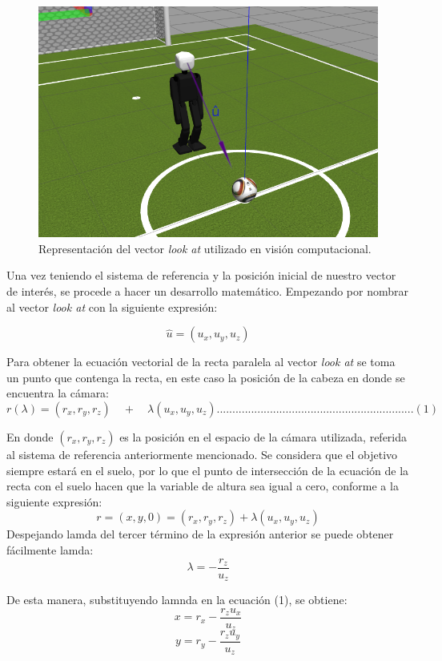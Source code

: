 \documentclass{book}
\begin{document}
\begin{figure}
	\centering		
	\includegraphics[scale=2]{images/robot_lookat.png}
	\caption{Representación del vector \textit{look at} utilizado en visión computacional.}		
\end{figure}


Una vez teniendo el sistema de referencia y la posición inicial de nuestro vector de interés, se procede a hacer un desarrollo matemático. Empezando por nombrar al vector \textit{look at} con la siguiente expresión:

\[\hat{u} = (u_x, u_y, u_z)\]
 
Para obtener la ecuación vectorial de la recta paralela al vector \textit{look at} se toma un punto que contenga la recta, en este caso la posición de la cabeza en donde se encuentra la cámara:
\[r(\lambda) = (r_x, r_y, r_z)\quad +\quad \lambda (u_x, u_y, u_z)...............................................................(1)\]

En donde $(r_x, r_y, r_z)$ es la posición en el espacio de la cámara utilizada, referida al sistema de referencia anteriormente mencionado. Se considera que el objetivo siempre estará en el suelo, por lo que el punto de intersección de la ecuación de la recta con el suelo hacen que la variable de altura sea igual a cero, conforme a la siguiente expresión:
\[r = (x, y, 0) = (r_x, r_y, r_z) + \lambda (u_x, u_y, u_z)\]
Despejando lamda del tercer término de la expresión anterior se puede obtener fácilmente lamda:
\[\lambda = -\frac{r_z}{u_z}\]

De esta manera, substituyendo lamnda en la ecuación (1), se obtiene:
\[x = r_x-\frac{r_z u_x}{u_z}\]
\[y = r_y-\frac{r_z u_y}{u_z}\]
\end{document}
